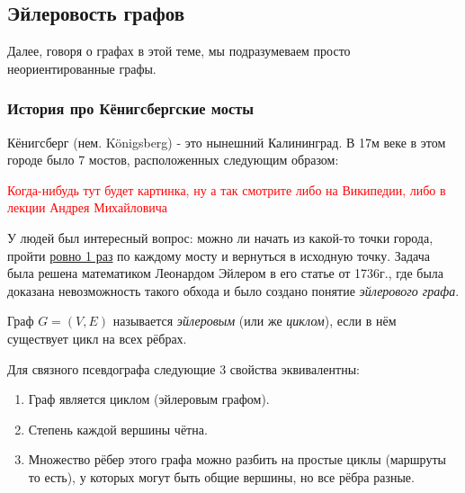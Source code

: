 \subsection{Эйлеровость графов}

\begin{note}
	Далее, говоря о графах в этой теме, мы подразумеваем просто неориентированные графы.
\end{note}

\subsubsection*{История про Кёнигсбергские мосты}

Кёнигсберг (нем. Königsberg) - это нынешний Калининград. В 17м веке в этом городе было 7 мостов, расположенных следующим образом:

\textcolor{red}{Когда-нибудь тут будет картинка, ну а так смотрите либо на Википедии, либо в лекции Андрея Михайловича}

У людей был интересный вопрос: можно ли начать из какой-то точки города, пройти \underline{ровно 1 раз} по каждому мосту и вернуться в исходную точку. Задача была решена математиком Леонардом Эйлером в его статье от 1736г., где была доказана невозможность такого обхода и было создано понятие \textit{эйлерового графа}.

\begin{definition}
	Граф $G = (V, E)$ называется \textit{эйлеровым} (или же \textit{циклом}), если в нём существует цикл на всех рёбрах.
\end{definition}

\begin{theorem}
	Для связного псевдографа следующие 3 свойства эквивалентны:
	\begin{enumerate}
		\item Граф является циклом (эйлеровым графом).
		
		\item Степень каждой вершины чётна.
		
		\item Множество рёбер этого графа можно разбить на простые циклы (маршруты то есть), у которых могут быть общие вершины, но все рёбра разные.
	\end{enumerate}
\end{theorem}

